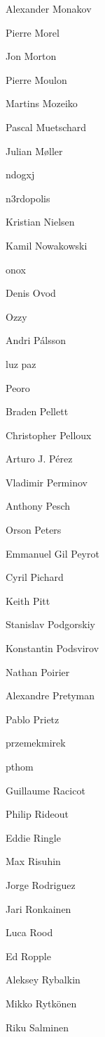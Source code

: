 \begin{DoxyItemize}
\item Alexander Monakov
\item Pierre Morel
\item Jon Morton
\item Pierre Moulon
\item Martins Mozeiko
\item Pascal Muetschard
\item Julian Møller
\item ndogxj
\item n3rdopolis
\item Kristian Nielsen
\item Kamil Nowakowski
\item onox
\item Denis Ovod
\item Ozzy
\item Andri Pálsson
\item luz paz
\item Peoro
\item Braden Pellett
\item Christopher Pelloux
\item Arturo J. Pérez
\item Vladimir Perminov
\item Anthony Pesch
\item Orson Peters
\item Emmanuel Gil Peyrot
\item Cyril Pichard
\item Keith Pitt
\item Stanislav Podgorskiy
\item Konstantin Podsvirov
\item Nathan Poirier
\item Alexandre Pretyman
\item Pablo Prietz
\item przemekmirek
\item pthom
\item Guillaume Racicot
\item Philip Rideout
\item Eddie Ringle
\item Max Risuhin
\item Jorge Rodriguez
\item Jari Ronkainen
\item Luca Rood
\item Ed Ropple
\item Aleksey Rybalkin
\item Mikko Rytkönen
\item Riku Salminen

\end{DoxyItemize}
